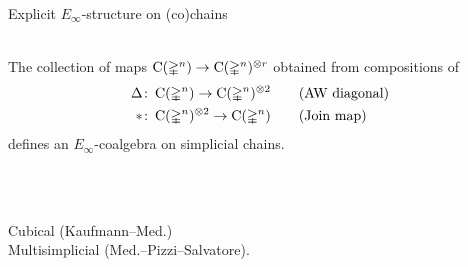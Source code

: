\begin{frame}{Explicit $E_\infty$-structure on (co)chains}

	 \\
	The collection of maps $\operatorname{C}(\mathbb{\Delta}^n) \to \operatorname{C}(\mathbb{\Delta}^n)^{\otimes r}$ obtained from compositions of
	\begin{align*}
		\Delta &\colon \operatorname{C}(\mathbb{\Delta}^n) \to \operatorname{C}(\mathbb{\Delta}^n)^{\otimes 2}
		\qquad \text{(AW diagonal)} \\
		\ast &\colon \operatorname{C}(\mathbb{\Delta}^n)^{\otimes 2} \to \operatorname{C}(\mathbb{\Delta}^n)
		\qquad \text{(Join map)}
	\end{align*}
	defines an $E_\infty$-coalgebra on simplicial chains.

	\bigskip\pause
	 \\
	\qquad\qquad \scalebox{0.7}{}

	\bigskip\pause
	 \\
	 Cubical (Kaufmann--Med.) \\
	 Multisimplicial (Med.--Pizzi--Salvatore).
\end{frame}

